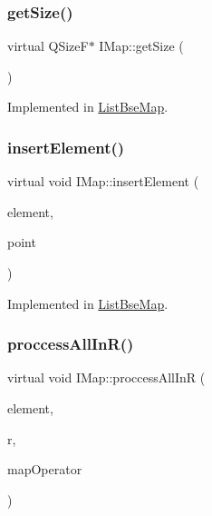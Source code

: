 \subsubsection{\texorpdfstring{get\+Size()}{getSize()}}
{\footnotesize\ttfamily virtual Q\+SizeF$\ast$ I\+Map\+::get\+Size (\begin{DoxyParamCaption}{ }\end{DoxyParamCaption})\hspace{0.3cm}{\ttfamily [pure virtual]}}



Implemented in \hyperlink{a00169_ae58cec494eba5e73b55bfb2f68fc3b52}{List\+Bse\+Map}.

\mbox{\label{a00165_a2d44fb3d3798e08bebcd25ad5f1787f4}} 
\subsubsection{\texorpdfstring{insert\+Element()}{insertElement()}}
{\footnotesize\ttfamily virtual void I\+Map\+::insert\+Element (\begin{DoxyParamCaption}\item[{\hyperlink{a00137}{I\+Base\+Game\+Element} $\ast$}]{element,  }\item[{Q\+Vector3D}]{point }\end{DoxyParamCaption})\hspace{0.3cm}{\ttfamily [pure virtual]}}



Implemented in \hyperlink{a00169_a7aeae2bf692effb329f9a34604a6c286}{List\+Bse\+Map}.

\mbox{\label{a00165_aa4feb51c5d024c99d4c57ccf5d2ff82d}} 
\subsubsection{\texorpdfstring{proccess\+All\+In\+R()}{proccessAllInR()}}
{\footnotesize\ttfamily virtual void I\+Map\+::proccess\+All\+InR (\begin{DoxyParamCaption}\item[{\hyperlink{a00137}{I\+Base\+Game\+Element} $\ast$}]{element,  }\item[{double}]{r,  }\item[{bool(\&)(\hyperlink{a00137}{I\+Base\+Game\+Element} $\ast$element)}]{map\+Operator }\end{DoxyParamCaption})\hspace{0.3cm}{\ttfamily [pure virtual]}}

